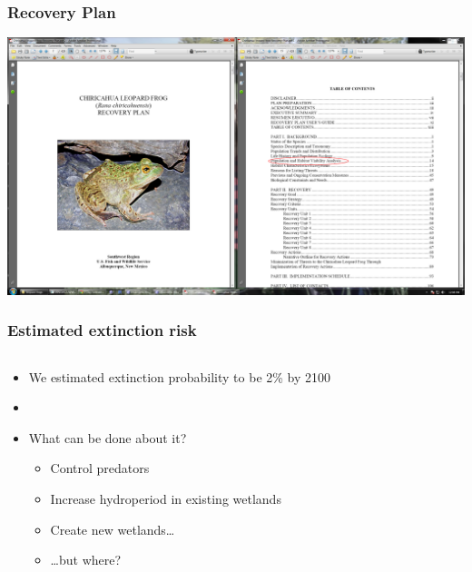 \documentclass[color=usenames,dvipsnames]{beamer}
\begin{document}
\begin{frame}
  \frametitle{Recovery Plan}
  \begin{center}
    \includegraphics[width=\textwidth]{figs/lich-recovery-plan}
  \end{center}
\end{frame}



\begin{frame}
  \frametitle{Estimated extinction risk}
  \begin{columns}
    \begin{column}{0.6\textwidth}
      \begin{itemize}%
      \item<1-> We estimated extinction probability to be 2\% by 2100
      \item[]
      \item<2-> What can be done about it?
        \begin{itemize}
        \item<3-> Control predators
        \item<4-> Increase hydroperiod in existing wetlands
        \item<5-> Create new wetlands\dots
        \item<6-> \dots but where?
        \end{itemize}
      \end{itemize}
    \end{column}
    \begin{column}{0.4\textwidth}
      \begin{center}
      \end{center}
    \end{column}
  \end{columns}
\end{frame}
\end{document}
